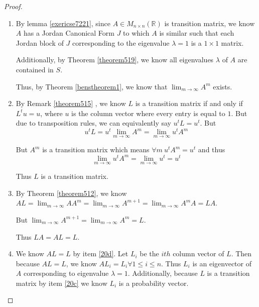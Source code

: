\documentclass{amsart}
\theoremstyle{definition}
\theoremstyle{remark}
\numberwithin{equation}{section}
\begin{document}
\begin{proof} \leavevmode

\begin{enumerate}

    \item \label{20b}

        By lemma \ref{exericse7221}, since $A \in M_{n \times n}(\mathbb{R})$ is transition matrix, we know $A$ has
        a Jordan Canonical Form $J$ to which $A$ is similar such that each Jordan block of $J$ corresponding to the eigenvalue $\lambda = 1$ is a $1 \times 1$ matrix.

        Additionally, by Theorem \ref{theorem519}, we know all eigenvalues $\lambda$ of $A$ are contained in $S$.

        Thus, by Theorem \ref{benstheorem1}, we know that $\lim_{m \to \infty} A^m$ exists.



    \item \label{20c}{}
            By Remark \ref{theorem515} , we know $L$ is a transition matrix if and only if $L^tu = u$, where $u$ is the column vector where every entry is equal to $1$.
            But due to transposition rules, we can equivalently say  $u^tL = u^t$.
            But
            $$u^tL = u^t \lim_{m \to \infty} A^m = \lim_{m \to \infty} u^t A^m$$

            But $A^m$ is a transition matrix which means $\forall m\ u^t A^m = u^t$ and thus
            $$\lim_{m \to \infty} u^t A^m = \lim_{m \to \infty} u^t = u^t $$

            Thus $L$ is a transition matrix.


    \item \label{20d}

            By Theorem \ref{theorem512}, we know $AL = \lim_{m \to \infty} A A^m = \lim_{m \to \infty} A^{m+1} = \lim_{m \to \infty} A^mA  = LA$.

            But $\lim_{m \to \infty} A^{m+1} = \lim_{m \to \infty} A^{m} = L$.

            Thus $LA = AL = L$.


    \item \label{20e}

            We know $AL = L$ by item \ref{20d}.
            Let $L_i$ be the $ith$ column vector of $L$.
            Then because $AL = L$, we know $AL_i = L_i \forall 1 \leq i \leq n$.
            Thus $L_i$ is an eigenvector of $A$ corresponding to eigenvalue $\lambda = 1$.
            Additionally, because $L$ is a transition matrix by item \ref{20c} we know $L_i$ is a probability vector.


\end{enumerate}
\end{proof}
\end{document}
